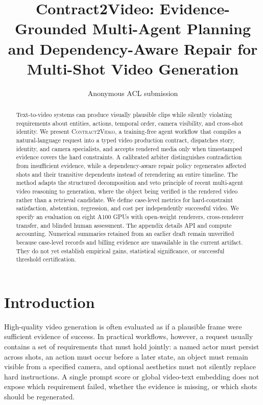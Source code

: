 \documentclass[11pt]{article}
\title{Contract2Video: Evidence-Grounded Multi-Agent Planning and Dependency-Aware Repair for Multi-Shot Video Generation}
\author{Anonymous ACL submission}
\newcommand{\method}{\textsc{Contract2Video}}
\begin{document}
\maketitle

\begin{abstract}
Text-to-video systems can produce visually plausible clips while silently
violating requirements about entities, actions, temporal order, camera
visibility, and cross-shot identity. We present \method, a training-free agent
workflow that compiles a natural-language request into a typed video
production contract, dispatches story, identity, and camera specialists, and
accepts rendered media only when timestamped evidence covers the hard
constraints. A calibrated arbiter distinguishes contradiction from insufficient
evidence, while a dependency-aware repair policy regenerates affected shots
and their transitive dependents instead of rerendering an entire timeline. The
method adapts the structured decomposition and veto principle of recent
multi-agent video reasoning to generation, where the object being verified is
the rendered video rather than a retrieval candidate. We define case-level
metrics for hard-constraint satisfaction, abstention, regression, and cost per
independently successful video. We specify an evaluation on eight A100 GPUs
with open-weight renderers, cross-renderer transfer, and blinded human
assessment. The appendix details API and compute accounting. Numerical
summaries retained from an earlier draft remain unverified because case-level
records and billing evidence are unavailable in the current artifact.
They do not yet establish empirical gains, statistical significance, or
successful threshold certification.
\end{abstract}

\section{Introduction}
\label{sec:intro}

High-quality video generation is often evaluated as if a plausible frame were
sufficient evidence of success. In practical workflows, however, a request
usually contains a set of requirements that must hold jointly: a named actor
must persist across shots, an action must occur before a later state, an object
must remain visible from a specified camera, and optional aesthetics must not
silently replace hard instructions. A single prompt score or global video-text
embedding does not expose which requirement failed, whether the evidence is
missing, or which shots should be regenerated.
\end{document}
